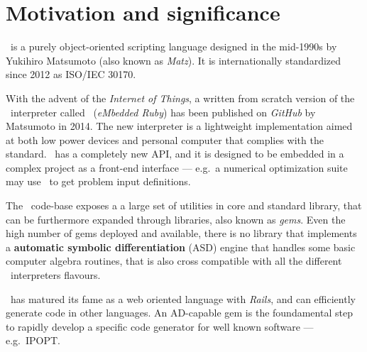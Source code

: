 \section{Motivation and significance}
\label{sec:motivation}

\Ruby~is a purely object-oriented scripting language designed in the mid-1990s by Yukihiro Matsumoto (also known as \emph{Matz}). It is internationally standardized since 2012 as ISO/IEC 30170.

With the advent of the \emph{Internet of Things}, a written from scratch version of the \Ruby~interpreter called \Mruby~(\emph{eMbedded Ruby}) has been published on \emph{GitHub} by Matsumoto in 2014. The new interpreter is a lightweight implementation aimed at both low power devices and personal computer that complies with the standard. \Mruby~has a completely new API, and it is designed to be embedded in a complex project as a front-end interface --- e.g.\ a numerical optimization suite may use \Mruby~to get problem input definitions.

The \Ruby~code-base exposes a a large set of utilities in core and standard library, that can be furthermore expanded through libraries, also known as \emph{gems}. Even the high number of gems deployed and available, there is no library that implements a \textbf{automatic symbolic differentiation} (ASD) engine that handles some basic computer algebra routines, that is also cross compatible with all the different \Ruby~interpreters flavours.

\Ruby~has matured its fame as a web oriented language with \emph{Rails}, and can efficiently generate code in other languages. An AD-capable gem is the foundamental step to rapidly develop a specific code generator for well known software --- e.g.\ IPOPT\@.

